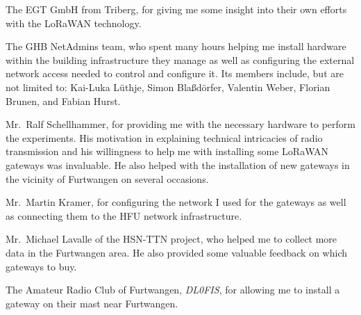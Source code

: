 The EGT GmbH from Triberg, for giving me some insight into their own efforts with the \ac{LoRaWAN} technology.

The \ac{GHB} NetAdmins team, who spent many hours helping me install hardware within the building infrastructure they manage as well as configuring the external network access needed to control and configure it.
Its members include, but are not limited to: Kai-Luka Lüthje, Simon Blaßdörfer, Valentin Weber, Florian Brunen, and Fabian Hurst.

Mr.\ Ralf Schellhammer, for providing me with the necessary hardware to perform the experiments.
His motivation in explaining technical intricacies of radio transmission and his willingness to help me with installing some \ac{LoRaWAN} gateways was invaluable.
He also helped with the installation of new gateways in the vicinity of Furtwangen on several occasions.

Mr.\ Martin Kramer, for configuring the network I used for the gateways as well as connecting them to the \ac{HFU} network infrastructure.

Mr.\ Michael Lavalle of the \ac{HSN-TTN} project, who helped me to collect more data in the Furtwangen area.
He also provided some valuable feedback on which gateways to buy.

The Amateur Radio Club of Furtwangen, \emph{DL0FIS}, for allowing me to install a gateway on their mast near Furtwangen.

